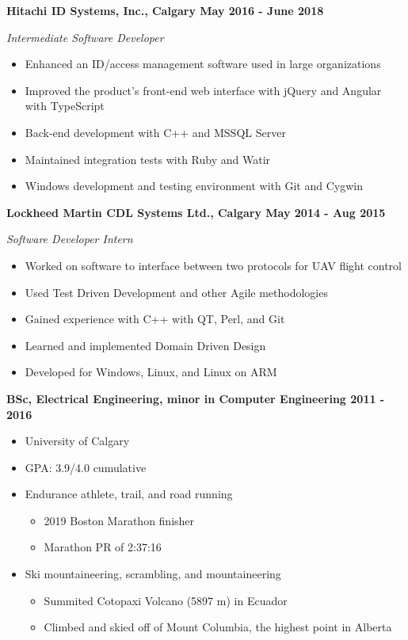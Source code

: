 \documentclass[12pt]{article}
\begin{document}
\noindent \centerline{ \bf Hitachi ID Systems, Inc., Calgary \hfill May 2016 - June 2018}
\indent \emph{ Intermediate Software Developer }
\begin{itemize}
  \item Enhanced an ID/access management software used in large organizations
  \item Improved the product's front-end web interface with jQuery and Angular with TypeScript
  \item Back-end development with C++ and MSSQL Server
  \item Maintained integration tests with Ruby and Watir
  \item Windows development and testing environment with Git and Cygwin
\end{itemize}
\medskip

\noindent \centerline{ \bf Lockheed Martin CDL Systems Ltd., Calgary \hfill May 2014 - Aug 2015}
\indent \emph{ Software Developer Intern }
\begin{itemize}
  \item Worked on software to interface between two protocols for UAV flight control
  \item Used Test Driven Development and other Agile methodologies
  \item Gained experience with C++ with QT, Perl, and Git
  \item Learned and implemented Domain Driven Design
  \item Developed for Windows, Linux, and Linux on ARM
\end{itemize}
\medskip

\bigskip
{}
\medskip

\noindent \centerline{ \bf BSc, Electrical Engineering, minor in Computer Engineering  \hfill 2011 - 2016}
\begin{itemize}[parsep=0pt,partopsep=0pt]
  \item University of Calgary
  \item GPA: 3.9/4.0 cumulative
\end{itemize}

\bigskip
{}
\medskip

\begin{itemize}
\item Endurance athlete, trail, and road running
  \begin{itemize}
    \item 2019 Boston Marathon finisher
    \item Marathon PR of 2:37:16
  \end{itemize}
\item Ski mountaineering, scrambling, and mountaineering
  \begin{itemize}
    \item Summited Cotopaxi Volcano (5897 m) in Ecuador
    \item Climbed and skied off of Mount Columbia, the highest point in Alberta
  \end{itemize}
\end{itemize}
\end{document}

